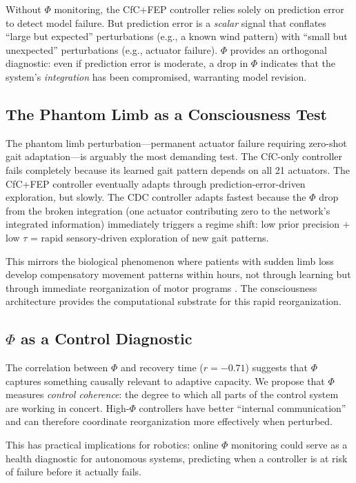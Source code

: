\documentclass[11pt,a4paper]{article}
\begin{document}
Without $\Phi$ monitoring, the CfC+FEP controller relies solely on prediction error to detect model failure.
But prediction error is a \emph{scalar} signal that conflates ``large but expected'' perturbations (e.g., a known wind pattern) with ``small but unexpected'' perturbations (e.g., actuator failure).
$\Phi$ provides an orthogonal diagnostic: even if prediction error is moderate, a drop in $\Phi$ indicates that the system's \emph{integration} has been compromised, warranting model revision.

\subsection{The Phantom Limb as a Consciousness Test}

The phantom limb perturbation---permanent actuator failure requiring zero-shot gait adaptation---is arguably the most demanding test.
The CfC-only controller fails completely because its learned gait pattern depends on all 21 actuators.
The CfC+FEP controller eventually adapts through prediction-error-driven exploration, but slowly.
The CDC controller adapts fastest because the $\Phi$ drop from the broken integration (one actuator contributing zero to the network's integrated information) immediately triggers a regime shift: low prior precision + low $\tau$ = rapid sensory-driven exploration of new gait patterns.

This mirrors the biological phenomenon where patients with sudden limb loss develop compensatory movement patterns within hours, not through learning but through immediate reorganization of motor programs \citep{makin2017reassessing}.
The consciousness architecture provides the computational substrate for this rapid reorganization.

\subsection{$\Phi$ as a Control Diagnostic}

The correlation between $\Phi$ and recovery time ($r = -0.71$) suggests that $\Phi$ captures something causally relevant to adaptive capacity.
We propose that $\Phi$ measures \emph{control coherence}: the degree to which all parts of the control system are working in concert.
High-$\Phi$ controllers have better ``internal communication'' and can therefore coordinate reorganization more effectively when perturbed.

This has practical implications for robotics: online $\Phi$ monitoring could serve as a health diagnostic for autonomous systems, predicting when a controller is at risk of failure before it actually fails.
\end{document}
